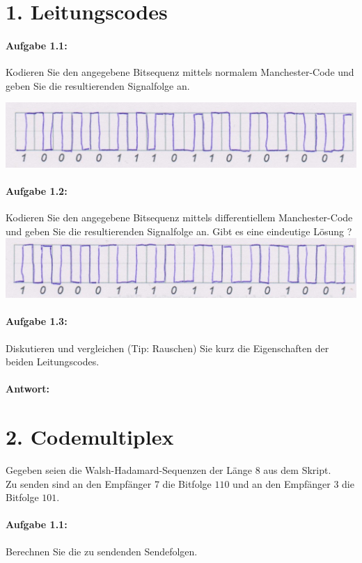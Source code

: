 \section{1. Leitungscodes}
\paragraph{Aufgabe 1.1:}
	Kodieren Sie den angegebene Bitsequenz mittels normalem Manchester-Code und geben Sie die resultierenden Signalfolge an.

\includegraphics[scale=0.2]{blatt3_1_1}
\paragraph{Aufgabe 1.2:}
	Kodieren Sie den angegebene Bitsequenz mittels differentiellem Manchester-Code und geben Sie die resultierenden Signalfolge an. Gibt es eine eindeutige Lösung ?
\includegraphics[scale=0.2]{blatt3_1_2}

\paragraph{Aufgabe 1.3:}
	Diskutieren und vergleichen (Tip: Rauschen) Sie kurz die Eigenschaften der beiden Leitungscodes.
\paragraph{Antwort:}
\section{2. Codemultiplex}
Gegeben seien die Walsh-Hadamard-Sequenzen der Länge 8 aus dem Skript.\\
Zu senden sind an den Empfänger 7 die Bitfolge $110$ und an den Empfänger 3 die Bitfolge $101$.
\paragraph{Aufgabe 1.1:}
	Berechnen Sie die zu sendenden Sendefolgen.
